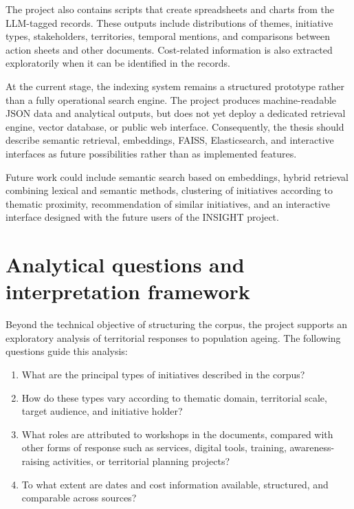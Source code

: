 The project also contains scripts that create spreadsheets and charts from the
LLM-tagged records. These outputs include distributions of themes, initiative
types, stakeholders, territories, temporal mentions, and comparisons between
action sheets and other documents. Cost-related information is also extracted
exploratorily when it can be identified in the records.

At the current stage, the indexing system remains a structured prototype rather
than a fully operational search engine. The project produces machine-readable
JSON data and analytical outputs, but does not yet deploy a dedicated retrieval
engine, vector database, or public web interface. Consequently, the thesis
should describe semantic retrieval, embeddings, FAISS, Elasticsearch, and
interactive interfaces as future possibilities rather than as implemented
features.

Future work could include semantic search based on embeddings, hybrid retrieval
combining lexical and semantic methods, clustering of initiatives according to
thematic proximity, recommendation of similar initiatives, and an interactive
interface designed with the future users of the INSIGHT project.

\section{Analytical questions and interpretation framework}

Beyond the technical objective of structuring the corpus, the project supports
an exploratory analysis of territorial responses to population ageing. The
following questions guide this analysis:

\begin{enumerate}
    \item What are the principal types of initiatives described in the corpus?
    \item How do these types vary according to thematic domain, territorial
    scale, target audience, and initiative holder?
    \item What roles are attributed to workshops in the documents, compared with
    other forms of response such as services, digital tools, training,
    awareness-raising activities, or territorial planning projects?
    \item To what extent are dates and cost information available, structured,
    and comparable across sources?
\end{enumerate}

